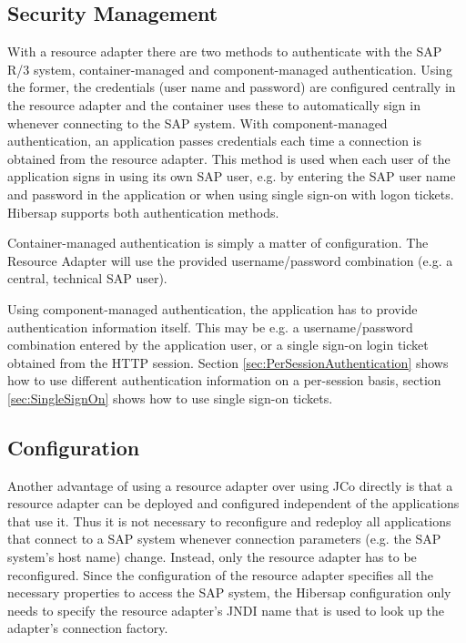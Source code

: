
\subsection{Security Management}
With a resource adapter there are two methods to authenticate with the SAP R/3 system, container-managed and component-managed authentication. Using the former, the credentials (user name and password) are configured centrally in the resource adapter and the container uses these to automatically sign in whenever connecting to the SAP system. With component-managed authentication, an application passes credentials each time a connection is obtained from the resource adapter. This method is used when each user of the application signs in using its own SAP user, e.g. by entering the SAP user name and password in the application or when using single sign-on with logon tickets. Hibersap supports both authentication methods.

Container-managed authentication is simply a matter of configuration. The Resource Adapter will use the provided username/password combination (e.g. a central, technical SAP user).

Using component-managed authentication, the application has to provide authentication information itself. This may be e.g. a username/password combination entered by the application user, or a single sign-on login ticket obtained from the HTTP session. Section \ref{sec:PerSessionAuthentication} shows how to use different authentication information on a per-session basis, section \ref{sec:SingleSignOn} shows how to use single sign-on tickets.  

\subsection{Configuration}
Another advantage of using a resource adapter over using JCo directly is that a resource adapter can be deployed and configured independent of the applications that use it. Thus it is not necessary to reconfigure and redeploy all applications that connect to a SAP system whenever connection parameters (e.g. the SAP system's host name) change. 
Instead, only the resource adapter has to be reconfigured. Since the configuration of the resource adapter specifies 
all the necessary properties to access the SAP system, the Hibersap configuration only needs to specify the resource adapter's JNDI name that is used to look up the adapter's connection factory. 

